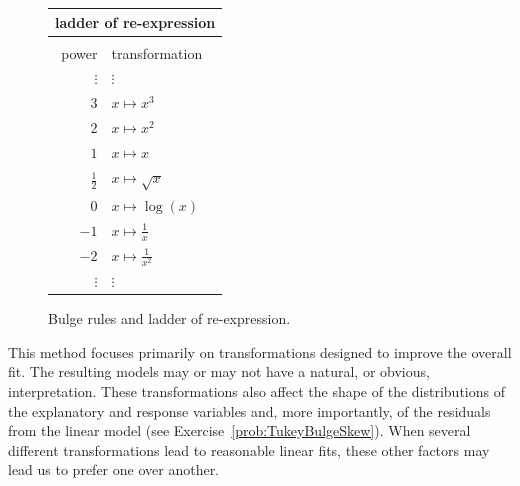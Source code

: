 \documentclass[twoside]{book}\usepackage[]{graphicx}\usepackage[]{xcolor}
\begin{document}
\begin{figure}
\begin{center}
\hfill
\begin{minipage}{0.35\textwidth}
\vspace*{-1.5in}
\begin{tabular}{rl}
\multicolumn{2}{c}{\textbf{ladder of re-expression}}
\\
\hline
\\[-1mm]
{power} & {transformation}\\
$\vdots$ & $\vdots$ \\
$3$ & $x \mapsto x^3$ \\[1mm]
$2$ & $x \mapsto x^2$ \\[1mm]
$1$ & $x \mapsto x$ \\[1mm]
$\frac12$ & $x \mapsto \sqrt{x}$ \\[1mm]
$0$ & $x \mapsto \log(x)$ \\[1mm]
$-1$ & $x \mapsto \frac1x$ \\[1mm]
$-2$ & $x \mapsto \frac{1}{x^2}$ \\[1mm]
$\vdots$ & $\vdots$ \\
\end{tabular}
\end{minipage}
\end{center}
\caption{Bulge rules and ladder of re-expression.}
\label{fig:TukeyBulge}%
\end{figure}
%

This method focuses primarily on transformations designed to improve
the overall fit.  The resulting models may or may not have 
a natural, or obvious, interpretation.  These transformations also affect the 
shape of the distributions of the explanatory and response variables
and, more importantly, of the residuals from the linear model  
(see Exercise~\ref{prob:TukeyBulgeSkew}).
When several different transformations lead to reasonable linear fits, these other
factors may lead us to prefer one over another.
\end{document}
